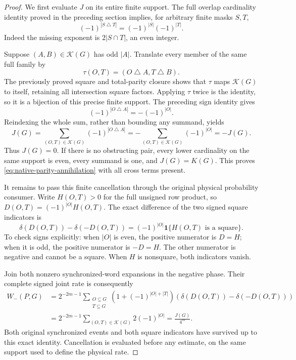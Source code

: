 \documentclass[11pt]{article}
\newcommand{\T}{\mathbf T}
\begin{document}
\begin{proof}
We first evaluate \(J\) on its entire finite support.
The full overlap cardinality identity proved in the preceding section
implies, for arbitrary finite masks \(S,T\),
\[
        (-1)^{|S\mathbin{\triangle}T|}
                         =(-1)^{|S|}(-1)^{|T|}.
\]
Indeed the missing exponent is \(2|S\cap T|\), an even integer.

Suppose \((A,B)\in\mathcal K(G)\) has odd \(|A|\). Translate every
member of the same full family by
\[
          \tau(O,T)=(O\mathbin{\triangle}A,T\mathbin{\triangle}B).
\]
The previously proved square and total-parity closure shows that
\(\tau\) maps \(\mathcal K(G)\) to itself, retaining all intersection
square factors. Applying \(\tau\) twice is the identity, so it is a
bijection of this precise finite support. The preceding sign identity
gives
\[
          (-1)^{|O\mathbin{\triangle}A|}
                      =-(-1)^{|O|}.
\]
Reindexing the whole sum, rather than bounding any summand, yields
\[
 J(G)=\sum_{(O,T)\in\mathcal K(G)}
                 (-1)^{|O\mathbin{\triangle}A|}
      =-\sum_{(O,T)\in\mathcal K(G)}(-1)^{|O|}
      =-J(G).
\]
Thus \(J(G)=0\). If there is no obstructing pair, every lower
cardinality on the same support is even, every summand is one,
and \(J(G)=K(G)\). This proves
\eqref{eq:native-parity-annihilation} with all cross terms present.

It remains to pass this finite cancellation through the original
physical probability consumer. Write \(H(O,T)>0\) for the full
unsigned row product, so \(D(O,T)=(-1)^{|O|}H(O,T)\).
The exact difference of the two signed square indicators is
\[
 \delta(D(O,T))-\delta(-D(O,T))
    =(-1)^{|O|}\mathbf1\{H(O,T)\text{ is a square}\}.
\]
To check signs explicitly: when \(|O|\) is even, the positive
numerator is \(D=H\); when it is odd, the positive numerator is
\(-D=H\). The other numerator is negative and cannot be a square.
When \(H\) is nonsquare, both indicators vanish.

Join both nonzero synchronized-word expansions in the negative phase.
Their complete signed joint rate is consequently
\begin{align*}
 W_-(P,G)
 &=2^{-2m-1}\sum_{\substack{O\subseteq G\\T\subseteq G}}
     \left(1+(-1)^{|O|+|T|}\right)
     \left(\delta(D(O,T))-\delta(-D(O,T))\right)\\
 &=2^{-2m-1}\sum_{(O,T)\in\mathcal K(G)}2(-1)^{|O|}
   =\frac{J(G)}{4^m}.
\end{align*}
Both original synchronized events and both square indicators have
survived up to this exact identity. Cancellation is evaluated before
any estimate, on the same support used to define the physical rate.


\end{proof}
\end{document}
